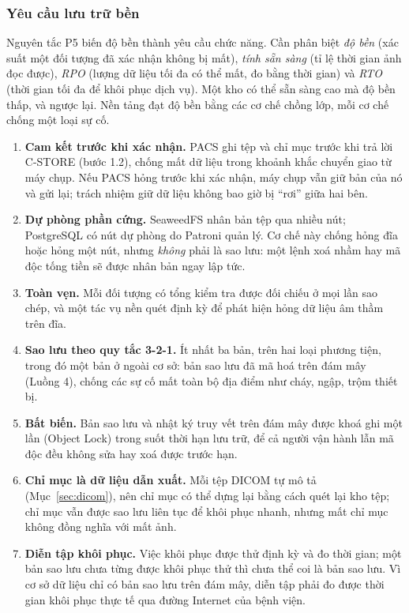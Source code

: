 \subsubsection{Yêu cầu lưu trữ bền}
\label{sec:durability}

Nguyên tắc P5 biến độ bền thành yêu cầu chức năng. Cần phân biệt \emph{độ bền} (xác
suất một đối tượng đã xác nhận không bị mất), \emph{tính sẵn sàng} (tỉ lệ thời gian ảnh
đọc được), \emph{RPO} (lượng dữ liệu tối đa có thể mất, đo bằng thời gian) và
\emph{RTO} (thời gian tối đa để khôi phục dịch vụ). Một kho có thể sẵn sàng cao mà độ
bền thấp, và ngược lại. Nền tảng đạt độ bền bằng các cơ chế chồng lớp, mỗi cơ chế chống
một loại sự cố.

\begin{enumerate}[label=D\arabic*.,leftmargin=1.2cm]
\item \textbf{Cam kết trước khi xác nhận.} PACS ghi tệp và chỉ mục trước khi trả lời
      C-STORE (bước 1.2), chống mất dữ liệu trong khoảnh khắc chuyển giao từ máy chụp.
      Nếu PACS hỏng trước khi xác nhận, máy chụp vẫn giữ bản của nó và gửi lại; trách nhiệm
      giữ dữ liệu không bao giờ bị ``rơi'' giữa hai bên.
\item \textbf{Dự phòng phần cứng.} SeaweedFS nhân bản tệp qua nhiều nút; PostgreSQL
      có nút dự phòng do Patroni quản lý. Cơ chế này chống hỏng đĩa hoặc hỏng một nút,
      nhưng \emph{không} phải là sao lưu: một lệnh xoá nhầm hay mã độc tống tiền sẽ được
      nhân bản ngay lập tức.
\item \textbf{Toàn vẹn.} Mỗi đối tượng có tổng kiểm tra được đối chiếu ở mọi lần sao
      chép, và một tác vụ nền quét định kỳ để phát hiện hỏng dữ liệu âm thầm trên đĩa.
\item \textbf{Sao lưu theo quy tắc 3-2-1.} Ít nhất ba bản, trên hai loại phương tiện,
      trong đó một bản ở ngoài cơ sở: bản sao lưu đã mã hoá trên đám mây (Luồng 4),
      chống các sự cố mất toàn bộ địa điểm như cháy, ngập, trộm thiết bị.
\item \textbf{Bất biến.} Bản sao lưu và nhật ký truy vết trên đám mây được khoá ghi
      một lần (Object Lock) trong suốt thời hạn lưu trữ, để cả người vận hành lẫn mã
      độc đều không sửa hay xoá được trước hạn.
\item \textbf{Chỉ mục là dữ liệu dẫn xuất.} Mỗi tệp DICOM tự mô tả
      (Mục~\ref{sec:dicom}), nên chỉ mục có thể dựng lại bằng cách quét lại kho tệp;
      chỉ mục vẫn được sao lưu liên tục để khôi phục nhanh, nhưng mất chỉ mục không đồng
      nghĩa với mất ảnh.
\item \textbf{Diễn tập khôi phục.} Việc khôi phục được thử định kỳ và đo thời gian;
      một bản sao lưu chưa từng được khôi phục thử thì chưa thể coi là bản sao lưu. Vì
      cơ sở dữ liệu chỉ có bản sao lưu trên đám mây, diễn tập phải đo được thời gian khôi
      phục thực tế qua đường Internet của bệnh viện.
\end{enumerate}

